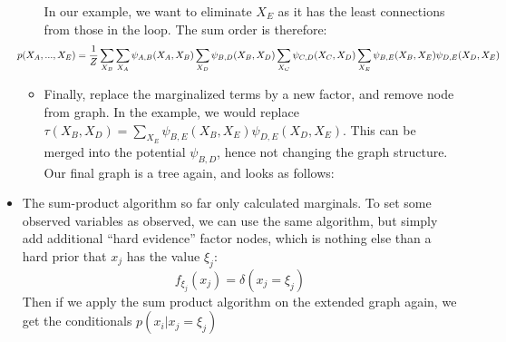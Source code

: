 \begin{itemize}
\begin{itemize}
		In our example, we want to eliminate $X_E$ as it has the least connections from those in the loop. The sum order is therefore:
		\begin{equation*}
			\hspace{-10mm}p(X_A,...,X_E) = \frac{1}{Z}\sum_{X_B}\sum_{X_A} \psi_{A,B}(X_A, X_B)\sum_{X_D}\psi_{B,D}(X_B, X_D) \sum_{X_C}\psi_{C,D}(X_C, X_D)\sum_{X_E} \psi_{B,E}(X_B, X_E)\psi_{D,E}(X_D, X_E)
		\end{equation*}
		\item Finally, replace the marginalized terms by a new factor, and remove node from graph. In the example, we would replace $\tau(X_B, X_D) = \sum_{X_E} \psi_{B,E}(X_B, X_E)\psi_{D,E}(X_D, X_E)$. This can be merged into the potential $\psi_{B,D}$, hence not changing the graph structure. Our final graph is a tree again, and looks as follows:
		\begin{figure}[ht!]
			\centering
		\end{figure}
	\end{itemize}
	\item The sum-product algorithm so far only calculated marginals. To set some observed variables as observed, we can use the same algorithm, but simply add additional ``hard evidence'' factor nodes, which is nothing else than a hard prior that $x_j$ has the value $\xi_j$:
	$$f_{\xi_j}(x_j)=\delta(x_j=\xi_j)$$
	Then if we apply the sum product algorithm on the extended graph again, we get the conditionals $p(x_i|x_j=\xi_j)$
\end{itemize}
